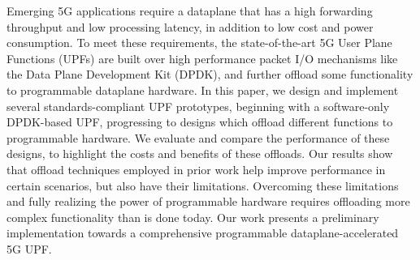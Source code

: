 Emerging 5G applications require a dataplane that has a high forwarding throughput and low processing latency, in addition to low cost and power consumption. 
To meet these requirements, the state-of-the-art 5G User Plane Functions (UPFs) are built over high performance packet I/O mechanisms like the Data Plane Development Kit (DPDK), and further offload some functionality to programmable dataplane hardware. In this paper, we design and implement several standards-compliant UPF prototypes, beginning with a software-only DPDK-based UPF, progressing to designs which offload different functions to programmable hardware. We evaluate and compare the performance of these designs, to highlight the costs and benefits of these offloads. Our results show that offload techniques employed in prior work help improve performance in certain scenarios, but also have their limitations. Overcoming these limitations and fully realizing the power of programmable hardware requires offloading more complex functionality than is done today. Our work presents a preliminary implementation towards a comprehensive programmable dataplane-accelerated 5G UPF. 

